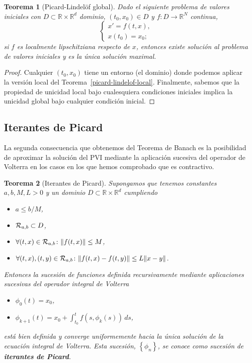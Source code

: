 \documentclass[11pt]{article}
\theoremstyle{plain}
\newtheorem{theorem}{Teorema}
\theoremstyle{definition}
\theoremstyle{remark}
\begin{document}
\begin{theorem}[Picard-Lindelöf global]\label{picard-lindelof-global}
  Dado el siguiente problema de valores iniciales con \(D \subset \mathbb{R} \times \mathbb{R}^d\) dominio,
  \((t_0,x_0) \in D\) y \(f \colon D \to \mathbb{R}^N\) continua,
  \[\left\{\begin{array}{l}
                  x' = f(t,x), \\
                  x(t_0) = x_0;
                \end{array}\right.\] 
  si \(f\) es localmente lipschitziana respecto de \(x\), entonces existe solución
  al problema de valores iniciales y es la única solución maximal.
\end{theorem}
\begin{proof}
  Cualquier $(t_0,x_0)$ tiene un entorno (el dominio) donde podemos aplicar
  la versión local del Teorema~\ref{picard-lindelof-local}. Finalmente, sabemos
  que la propiedad de unicidad local bajo cualesquiera condiciones iniciales
  implica la unicidad global bajo cualquier condición inicial.
\end{proof}



\subsection{Iterantes de Picard}

La segunda consecuencia que obtenemos del Teorema de Banach es la posibilidad
de aproximar la solución del PVI mediante la aplicación sucesiva del operador
de Volterra en los casos en los que hemos comprobado que es contractivo.

\begin{theorem}[Iterantes de Picard]
  Supongamos que tenemos constantes \(a,b,M,L > 0\) y un dominio \(D \subset \mathbb{R} \times \mathbb{R}^d\)
  cumpliendo
  \begin{itemize}
    \item \(a \leq b/M\),
    \item \({\cal R}_{a,b} \subset D\),
    \item \(\forall (t,x) \in {\cal R}_{a,b}\colon \|f(t,x)\| \leq M\),
    \item \(\forall (t,x),(t,y) \in {\cal R}_{a,b} \colon \|f(t,x)-f(t,y)\| \leq L \|x-y\|\).
  \end{itemize}
  Entonces la sucesión de funciones definida recursivamente mediante aplicaciones
  sucesivas del operador integral de Volterra
  \begin{itemize}
    \item \(\phi_0(t) = x_0\),
    \item \(\phi_{k+1}(t) = x_0 + \int_{t_0}^t f(s,\phi_k(s))\,ds\),
  \end{itemize}
  está bien definida y converge uniformemente hacia la única solución
  de la ecuación integral de Volterra. Esta sucesión, \(\left\{ \phi_n \right\}\), se conoce
  como sucesión de \textbf{iterantes de Picard}.
\end{theorem}
\end{document}
